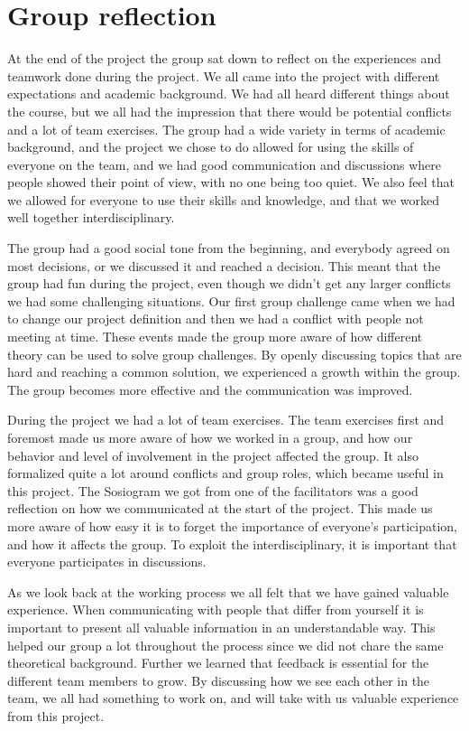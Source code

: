 \chapter{Group reflection}
\label{chap:reflection}
%
At the end of the project the group sat down to reflect on the experiences and teamwork done during the project. We all came into the project with different expectations and academic background. We had all heard different things about the course, but we all had the impression that there would be potential conflicts and a lot of team exercises. The group had a wide variety in terms of academic background, and the project we chose to do allowed for using the skills of everyone on the team, and we had good communication and discussions where people showed their point of view, with no one being too quiet. We also feel that we allowed for everyone to use their skills and knowledge, and that we worked well together interdisciplinary.

The group had a good social tone from the beginning, and everybody agreed on most decisions, or we discussed it and reached a decision. This meant that the group had fun during the project, even though we didn't get any larger conflicts we had some challenging situations. Our first group challenge came when we had to change our project definition and then we had a conflict with people not meeting at time. These events made the group more aware of how different theory can be used to solve group challenges. By openly discussing topics that are hard and reaching a common solution, we experienced a growth within the group. The group becomes more effective and the communication was improved.

During the project we had a lot of team exercises. The team exercises first and foremost made us more aware of how we worked in a group, and how our behavior and level of involvement in the project affected the group. It also formalized quite a lot around conflicts and group roles, which became useful in this project. The Sosiogram we got from one of the facilitators was a good reflection on how we communicated at the start of the project. This made us more aware of how easy it is to forget the importance of everyone’s participation, and how it affects the group. To exploit the interdisciplinary, it is important that everyone participates in discussions. 

As we look back at the working process we all felt that we have gained valuable experience. When communicating with people that differ from yourself it is important to present all valuable information in an understandable way. This helped our group a lot throughout the process since we did not chare the same theoretical background. Further we learned that feedback is essential for the different team members to grow. By discussing how we see each other in the team, we all had something to work on, and will take with us valuable experience from this project.  
